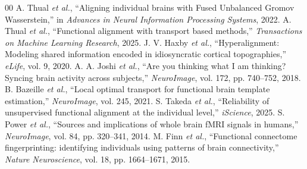 \documentclass[conference]{IEEEtran}
\begin{document}
\begin{thebibliography}{00}
 A. Thual \emph{et al.}, ``Aligning individual brains with Fused Unbalanced Gromov Wasserstein,'' in \emph{Advances in Neural Information Processing Systems}, 2022.
 A. Thual \emph{et al.}, ``Functional alignment with transport based methods,'' \emph{Transactions on Machine Learning Research}, 2025.
 J. V. Haxby \emph{et al.}, ``Hyperalignment: Modeling shared information encoded in idiosyncratic cortical topographies,'' \emph{eLife}, vol. 9, 2020.
 A. A. Joshi \emph{et al.}, ``Are you thinking what I am thinking? Syncing brain activity across subjects,'' \emph{NeuroImage}, vol. 172, pp. 740--752, 2018.
 B. Bazeille \emph{et al.}, ``Local optimal transport for functional brain template estimation,'' \emph{NeuroImage}, vol. 245, 2021.
 S. Takeda \emph{et al.}, ``Reliability of unsupervised functional alignment at the individual level,'' \emph{iScience}, 2025.
 S. Power \emph{et al.}, ``Sources and implications of whole brain fMRI signals in humans,'' \emph{NeuroImage}, vol. 84, pp. 320--341, 2014.
 M. Finn \emph{et al.}, ``Functional connectome fingerprinting: identifying individuals using patterns of brain connectivity,'' \emph{Nature Neuroscience}, vol. 18, pp. 1664--1671, 2015.
\end{thebibliography}
\end{document}
